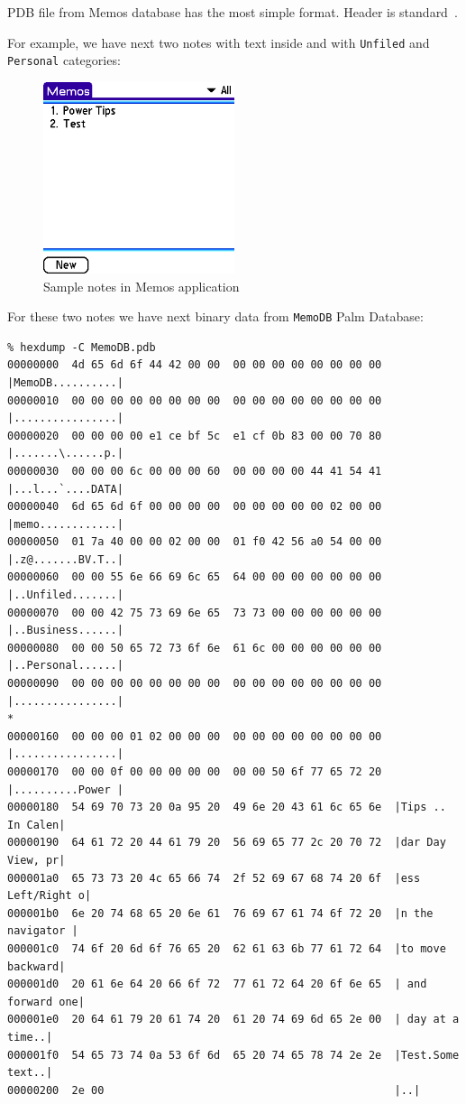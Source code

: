 \documentclass[a4paper,12pt,oneside]{scrartcl}
\begin{document}
PDB file from Memos database has the most simple format. Header is
standard~\cite{PalmFileFormatSpec}.

For example, we have next two notes with text inside and with \texttt{Unfiled}
and \texttt{Personal} categories:
\begin{figure}[H]
  \centering
  \includegraphics[width=0.5\textwidth]{memo.png}
  \caption{Sample notes in Memos application}
  \label{fig:sample-memos}
\end{figure}

For these two notes we have next binary data from \texttt{MemoDB} Palm Database:

\footnotesize
\begin{verbatim}
% hexdump -C MemoDB.pdb
00000000  4d 65 6d 6f 44 42 00 00  00 00 00 00 00 00 00 00  |MemoDB..........|
00000010  00 00 00 00 00 00 00 00  00 00 00 00 00 00 00 00  |................|
00000020  00 00 00 00 e1 ce bf 5c  e1 cf 0b 83 00 00 70 80  |.......\......p.|
00000030  00 00 00 6c 00 00 00 60  00 00 00 00 44 41 54 41  |...l...`....DATA|
00000040  6d 65 6d 6f 00 00 00 00  00 00 00 00 00 02 00 00  |memo............|
00000050  01 7a 40 00 00 02 00 00  01 f0 42 56 a0 54 00 00  |.z@.......BV.T..|
00000060  00 00 55 6e 66 69 6c 65  64 00 00 00 00 00 00 00  |..Unfiled.......|
00000070  00 00 42 75 73 69 6e 65  73 73 00 00 00 00 00 00  |..Business......|
00000080  00 00 50 65 72 73 6f 6e  61 6c 00 00 00 00 00 00  |..Personal......|
00000090  00 00 00 00 00 00 00 00  00 00 00 00 00 00 00 00  |................|
*
00000160  00 00 00 01 02 00 00 00  00 00 00 00 00 00 00 00  |................|
00000170  00 00 0f 00 00 00 00 00  00 00 50 6f 77 65 72 20  |..........Power |
00000180  54 69 70 73 20 0a 95 20  49 6e 20 43 61 6c 65 6e  |Tips .. In Calen|
00000190  64 61 72 20 44 61 79 20  56 69 65 77 2c 20 70 72  |dar Day View, pr|
000001a0  65 73 73 20 4c 65 66 74  2f 52 69 67 68 74 20 6f  |ess Left/Right o|
000001b0  6e 20 74 68 65 20 6e 61  76 69 67 61 74 6f 72 20  |n the navigator |
000001c0  74 6f 20 6d 6f 76 65 20  62 61 63 6b 77 61 72 64  |to move backward|
000001d0  20 61 6e 64 20 66 6f 72  77 61 72 64 20 6f 6e 65  | and forward one|
000001e0  20 64 61 79 20 61 74 20  61 20 74 69 6d 65 2e 00  | day at a time..|
000001f0  54 65 73 74 0a 53 6f 6d  65 20 74 65 78 74 2e 2e  |Test.Some text..|
00000200  2e 00                                             |..|
\end{verbatim}
\normalsize
\end{document}

